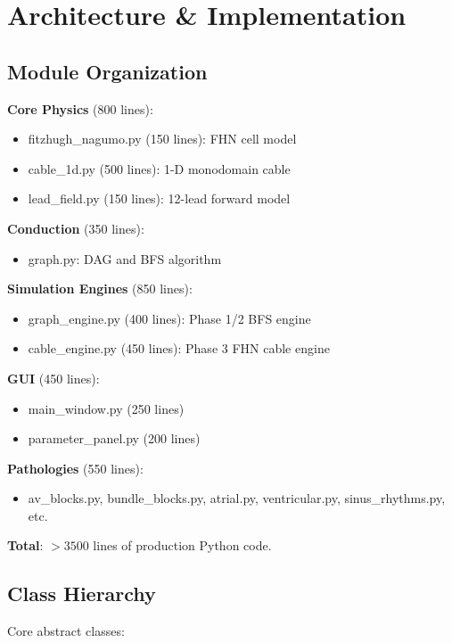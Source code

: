 \documentclass[12pt]{book}
\begin{document}
\chapter{Architecture \& Implementation}

\section{Module Organization}

\textbf{Core Physics} (800 lines):
\begin{itemize}
  \item fitzhugh\_nagumo.py (150 lines): FHN cell model
  \item cable\_1d.py (500 lines): 1-D monodomain cable
  \item lead\_field.py (150 lines): 12-lead forward model
\end{itemize}

\textbf{Conduction} (350 lines):
\begin{itemize}
  \item graph.py: DAG and BFS algorithm
\end{itemize}

\textbf{Simulation Engines} (850 lines):
\begin{itemize}
  \item graph\_engine.py (400 lines): Phase 1/2 BFS engine
  \item cable\_engine.py (450 lines): Phase 3 FHN cable engine
\end{itemize}

\textbf{GUI} (450 lines):
\begin{itemize}
  \item main\_window.py (250 lines)
  \item parameter\_panel.py (200 lines)
\end{itemize}

\textbf{Pathologies} (550 lines):
\begin{itemize}
  \item av\_blocks.py, bundle\_blocks.py, atrial.py, ventricular.py, sinus\_rhythms.py, etc.
\end{itemize}

\textbf{Total}: $>3500$ lines of production Python code.

\section{Class Hierarchy}

Core abstract classes:
\end{document}

